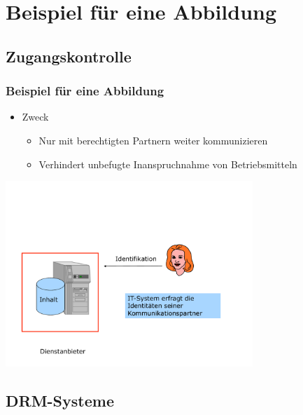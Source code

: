 \documentclass[t,aspectratio=169]{beamer}
\begin{document}
\section{Beispiel für eine Abbildung} %

\subsection{Zugangskontrolle} %
\begin{frame}
	\frametitle{Beispiel für eine Abbildung}
	\begin{itemize}
		\item Zweck
			\begin{itemize}
				\item Nur mit \alert{berechtigten Partnern} weiter kommunizieren
				\item Verhindert unbefugte Inanspruchnahme von Betriebsmitteln
			\end{itemize}
	\end{itemize}
	\vspace{\fill}
	\pause %
	\begin{center}
		\includegraphics[width=0.7\textwidth]{../pic/abbildung1.pdf}
	\end{center}
\end{frame}

\subsection{DRM-Systeme} %
\end{document}
